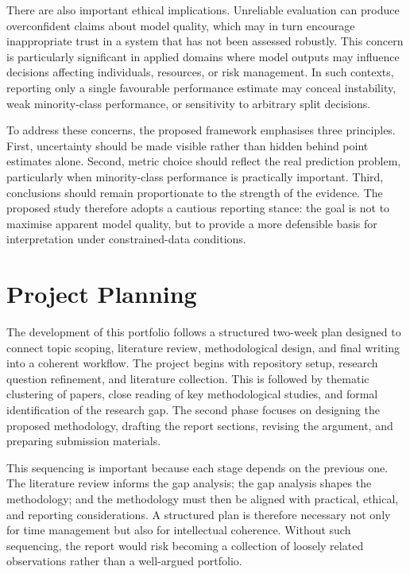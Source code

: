 \documentclass[11pt,a4paper]{article}
\begin{document}
There are also important ethical implications. Unreliable evaluation can produce overconfident claims about model quality, which may in turn encourage inappropriate trust in a system that has not been assessed robustly. This concern is particularly significant in applied domains where model outputs may influence decisions affecting individuals, resources, or risk management. In such contexts, reporting only a single favourable performance estimate may conceal instability, weak minority-class performance, or sensitivity to arbitrary split decisions.

To address these concerns, the proposed framework emphasises three principles. First, uncertainty should be made visible rather than hidden behind point estimates alone. Second, metric choice should reflect the real prediction problem, particularly when minority-class performance is practically important. Third, conclusions should remain proportionate to the strength of the evidence. The proposed study therefore adopts a cautious reporting stance: the goal is not to maximise apparent model quality, but to provide a more defensible basis for interpretation under constrained-data conditions.

\section{Project Planning}

The development of this portfolio follows a structured two-week plan designed to connect topic scoping, literature review, methodological design, and final writing into a coherent workflow. The project begins with repository setup, research question refinement, and literature collection. This is followed by thematic clustering of papers, close reading of key methodological studies, and formal identification of the research gap. The second phase focuses on designing the proposed methodology, drafting the report sections, revising the argument, and preparing submission materials.

This sequencing is important because each stage depends on the previous one. The literature review informs the gap analysis; the gap analysis shapes the methodology; and the methodology must then be aligned with practical, ethical, and reporting considerations. A structured plan is therefore necessary not only for time management but also for intellectual coherence. Without such sequencing, the report would risk becoming a collection of loosely related observations rather than a well-argued portfolio.
\end{document}
